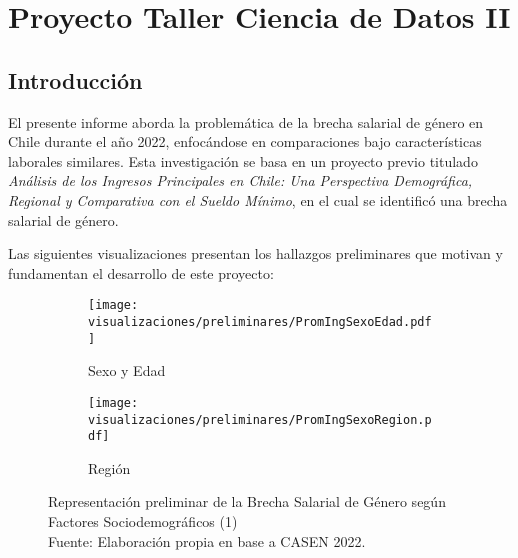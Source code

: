 \rhead{\newtitle}
\cfoot{\thepage}
\renewcommand{\headrulewidth}{1pt}
\renewcommand{\footrulewidth}{1pt}
\chapter{Proyecto Taller Ciencia de Datos II}

\section{Introducción}

El presente informe aborda la problemática de la brecha salarial de género en Chile durante el año 2022, enfocándose en comparaciones bajo características laborales similares. Esta investigación se basa en un proyecto previo titulado \textit{Análisis de los Ingresos Principales en Chile: Una Perspectiva Demográfica, Regional y Comparativa con el Sueldo Mínimo}, en el cual se identificó una brecha salarial de género.

Las siguientes visualizaciones presentan los hallazgos preliminares que motivan y fundamentan el desarrollo de este proyecto:

\FloatBarrier

\begin{figure}[htbp]
	\centering
	\begin{subfigure}[b]{0.49\textwidth}
		\centering
		\texttt{[image: visualizaciones/preliminares/PromIngSexoEdad.pdf]}
		\caption{Sexo y Edad}
		\label{1a}
	\end{subfigure}
	\hfill
	\begin{subfigure}[b]{0.49\textwidth}
		\centering
		\texttt{[image: visualizaciones/preliminares/PromIngSexoRegion.pdf]}
		\caption{Región}
		\label{1b}
	\end{subfigure}
	\caption{Representación preliminar de la Brecha Salarial de Género según Factores Sociodemográficos (1)\\Fuente: Elaboración propia en base a CASEN 2022. \citep{Proyecto1}}
	\label{01fig}
\end{figure}



